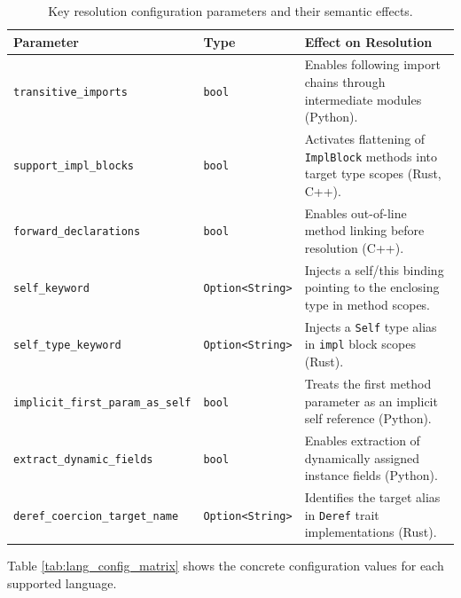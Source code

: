\begin{table}[htpb]
  \centering
  \small
  \begin{tabular}{|l|l|p{6cm}|}
    \hline
    \textbf{Parameter} & \textbf{Type} & \textbf{Effect on Resolution} \\ \hline
    \texttt{transitive\_imports} & \texttt{bool} & Enables following
    import chains through intermediate modules (Python). \\ \hline
    \texttt{support\_impl\_blocks} & \texttt{bool} & Activates
    flattening of \texttt{ImplBlock} methods into target type scopes
    (Rust, C++). \\ \hline
    \texttt{forward\_declarations} & \texttt{bool} & Enables
    out-of-line method linking before resolution (C++). \\ \hline
    \texttt{self\_keyword} & \texttt{Option<String>} & Injects a
    self/this binding pointing to the enclosing type in method scopes. \\ \hline
    \texttt{self\_type\_keyword} & \texttt{Option<String>} & Injects
    a \texttt{Self} type alias in \texttt{impl} block scopes (Rust). \\ \hline
    \texttt{implicit\_first\_param\_as\_self} & \texttt{bool} &
    Treats the first method parameter as an implicit self reference
    (Python). \\ \hline
    \texttt{extract\_dynamic\_fields} & \texttt{bool} & Enables
    extraction of dynamically assigned instance fields (Python). \\ \hline
    \texttt{deref\_coercion\_target\_name} & \texttt{Option<String>}
    & Identifies the target alias in \texttt{Deref} trait
    implementations (Rust). \\ \hline
  \end{tabular}
  \caption{Key resolution configuration parameters and their semantic effects.}
  \label{tab:resolution_config}
\end{table}

Table \ref{tab:lang_config_matrix} shows the concrete configuration
values for each supported language.

